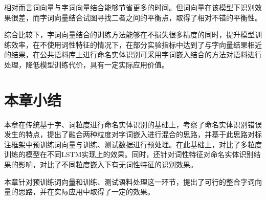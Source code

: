 相对而言词向量与字词向量结合能够节省更多的时间。但词向量在该模型下识别效果很差，而字词向量结合试图寻找二者之间的平衡点，取得了相对不错的平衡性。

综合比较下，字词向量结合的训练方法能够在不损失很多精度的同时，提升模型训练效率，在不使用词性特征的情况下，在部分实验指标中达到了与字向量结果相近的结果，在公共语料库上进行命名实体识别可采用字词嵌入结合的方法对语料进行处理，降低模型训练代价，具有一定实际应用价值。

\section{本章小结}
本章在传统基于字、词粒度进行命名实体识别的基础上，考察了命名实体识别错误发生的特点，提出了融合两种粒度对字词嵌入进行混合的思路，并基于此思路对标注框架中预训练词向量与训练、测试数据进行预处理。在此基础上，对比了多粒度训练的模型在不同LSTM实现上的效果。同时，还针对词性特征对命名实体识别结果的影响，对比了不同粒度嵌入下有无词性特征的识别效果。

本章针对预训练词向量和训练、测试语料处理这一环节，提出了可行的整合字词向量的思路，并在实际应用中取得了一定的效果。
